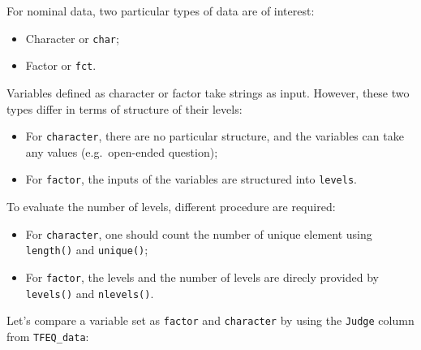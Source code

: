 \documentclass[
]{book}
\newenvironment{Shaded}{\begin{snugshade}}{\end{snugshade}}
\newcommand{\AttributeTok}[1]{\textcolor[rgb]{0.77,0.63,0.00}{#1}}
\newcommand{\FunctionTok}[1]{\textcolor[rgb]{0.00,0.00,0.00}{#1}}
\newcommand{\NormalTok}[1]{#1}
\newcommand{\OtherTok}[1]{\textcolor[rgb]{0.56,0.35,0.01}{#1}}
\newcommand{\SpecialCharTok}[1]{\textcolor[rgb]{0.00,0.00,0.00}{#1}}
\providecommand{\tightlist}{%
  \setlength{\itemsep}{0pt}\setlength{\parskip}{0pt}}
\begin{document}
For nominal data, two particular types of data are of interest:

\begin{itemize}
\tightlist
\item
  Character or \texttt{char};
\item
  Factor or \texttt{fct}.
\end{itemize}

Variables defined as character or factor take strings as input. However, these two types differ in terms of structure of their levels:

\begin{itemize}
\tightlist
\item
  For \texttt{character}, there are no particular structure, and the variables can take any values (e.g.~open-ended question);
\item
  For \texttt{factor}, the inputs of the variables are structured into \texttt{levels}.
\end{itemize}

To evaluate the number of levels, different procedure are required:

\begin{itemize}
\tightlist
\item
  For \texttt{character}, one should count the number of unique element using \texttt{length()} and \texttt{unique()};
\item
  For \texttt{factor}, the levels and the number of levels are direcly provided by \texttt{levels()} and \texttt{nlevels()}.
\end{itemize}

Let's compare a variable set as \texttt{factor} and \texttt{character} by using the \texttt{Judge} column from \texttt{TFEQ\_data}:

\begin{Shaded}
\end{Shaded}
\end{document}
